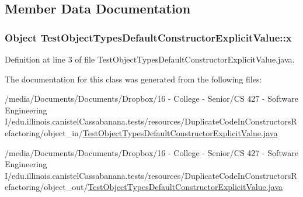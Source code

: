 \subsection{Member Data Documentation}
\hypertarget{classTestObjectTypesDefaultConstructorExplicitValue_a7f1f5fae9182a2110bbb4bb6f45d2285}{
\subsubsection[{x}]{\setlength{\rightskip}{0pt plus 5cm}Object {\bf TestObjectTypesDefaultConstructorExplicitValue::x}}}
\label{classTestObjectTypesDefaultConstructorExplicitValue_a7f1f5fae9182a2110bbb4bb6f45d2285}


Definition at line 3 of file TestObjectTypesDefaultConstructorExplicitValue.java.



The documentation for this class was generated from the following files:\begin{DoxyCompactItemize}
\item 
/media/Documents/Documents/Dropbox/16 -\/ College -\/ Senior/CS 427 -\/ Software Engineering I/edu.illinois.canistelCassabanana.tests/resources/DuplicateCodeInConstructorsRefactoring/object\_\-in/\hyperlink{object__in_2TestObjectTypesDefaultConstructorExplicitValue_8java}{TestObjectTypesDefaultConstructorExplicitValue.java}\item 
/media/Documents/Documents/Dropbox/16 -\/ College -\/ Senior/CS 427 -\/ Software Engineering I/edu.illinois.canistelCassabanana.tests/resources/DuplicateCodeInConstructorsRefactoring/object\_\-out/\hyperlink{object__out_2TestObjectTypesDefaultConstructorExplicitValue_8java}{TestObjectTypesDefaultConstructorExplicitValue.java}\end{DoxyCompactItemize}
